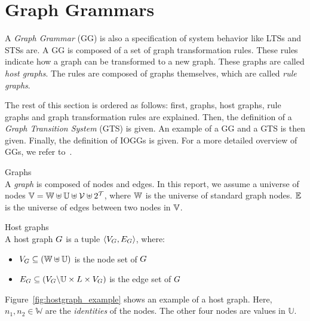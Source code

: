 \section{Graph Grammars}\label{sec:graph}
A \textit{Graph Grammar} (GG) is also a specification of system behavior like LTSs and STSs are. A GG is composed of a set of graph transformation rules. These rules indicate how a graph can be transformed to a new graph. These graphs are called \textit{host graphs}. The rules are composed of graphs themselves, which are called \textit{rule graphs}.

The rest of this section is ordered as follows: first, graphs, host graphs, rule graphs and graph transformation rules are explained. Then, the definition of a \textit{Graph Transition System} (GTS) is given. An example of a GG and a GTS is then given. Finally, the definition of IOGGs is given. For a more detailed overview of GGs, we refer to~\cite{Rensink:graph_grammars, Heckel2006187, Andries1999}.

\vspace{5px}
\begin{definition} Graphs \\
A \textit{graph} is composed of nodes and edges. In this report, we assume a universe of nodes $\mathbb{V} = \mathbb{W} \uplus \mathbb{U} \uplus \mathcal{V} \uplus 2^{\mathcal{T}}$, where $\mathbb{W}$ is the universe of standard graph nodes. $\mathbb{E}$ is the universe of edges between two nodes in $\mathbb{V}$.
\end{definition}

\vspace{5px}
\begin{definition} Host graphs \\
A host graph $G$ is a tuple $\langle V_{G}, E_{G}\rangle$, where:
\begin{itemize}
  \item $V_{G} \subseteq (\mathbb{W} \uplus \mathbb{U})$ is the node set of $G$
  \item $E_{G} \subseteq (V_{G}\backslash\mathbb{U} \times L \times V_{G})$ is the edge set of $G$
\end{itemize}
\end{definition}
\vspace{5px}

Figure~\ref{fig:hostgraph_example} shows an example of a host graph. Here, $n_1, n_2 \in \mathbb{W}$ are the \textit{identities} of the nodes. The other four nodes are values in $\mathbb{U}$.

